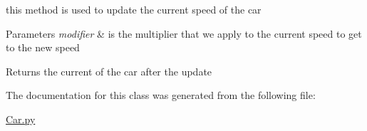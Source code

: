this method is used to update the current speed of the car 


\begin{DoxyParams}{Parameters}
{\em modifier} & is the multiplier that we apply to the current speed to get to the new speed \\
\hline
\end{DoxyParams}
\begin{DoxyReturn}{Returns}
the current of the car after the update 
\end{DoxyReturn}


The documentation for this class was generated from the following file\+:\begin{DoxyCompactItemize}
\item 
\mbox{\hyperlink{_car_8py}{Car.\+py}}\end{DoxyCompactItemize}
